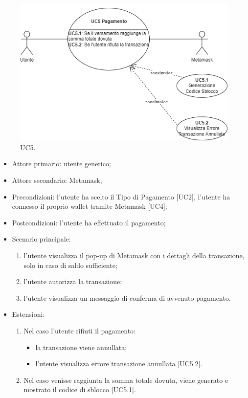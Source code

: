 \begin{figure}[H]
    \centering
    \includegraphics[scale=0.7]{immagini/UseCases-UC5.png}
    \caption{UC5.}
  \end{figure}

\begin{itemize}
    \item Attore primario: utente generico;
    \item Attore secondario: Metamask;
    \item Precondizioni: l'utente ha scelto il Tipo di Pagamento [UC2], l'utente ha connesso il proprio wallet tramite Metamask [UC4];
    \item Postcondizioni: l'utente ha effettuato il pagamento;
    \item Scenario principale:
    \begin{enumerate}
        \item l'utente visualizza il pop-up di Metamask con i dettagli della transazione, solo in caso di saldo sufficiente;
        \item l'utente autorizza la transazione;
        \item l'utente visualizza un messaggio di conferma di avvenuto pagamento.
    \end{enumerate}
    \item Estensioni:
    \begin{enumerate}
        \item Nel caso l'utente rifiuti il pagamento:
        \begin{itemize}
            \item la transazione viene annullata;
            \item l'utente visualizza errore transazione annullata [UC5.2].
        \end{itemize}
        \item Nel caso venisse raggiunta la somma totale dovuta, viene generato e mostrato il codice di sblocco [UC5.1].
    \end{enumerate}
\end{itemize}

